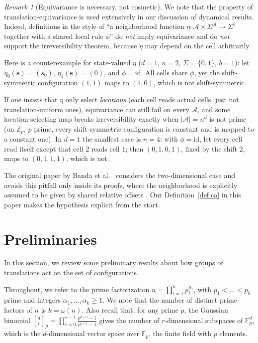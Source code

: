 \documentclass[11pt,a4paper]{article}
\theoremstyle{remark}
\newtheorem{remark}[theorem]{Remark}
\newcommand{\ZZ}{\mathbb{Z}}
\newcommand{\FF}{\mathbb{F}}
\newcommand{\A}{\mathcal{A}}
\newcommand{\ssb}{\mathbf{s}}
\newcommand{\gaussbinom}[2]{\genfrac{[}{]}{0pt}{}{#1}{#2}}
\begin{document}
\begin{remark}[Equivariance is necessary, not cosmetic]
\label{rem:equivariance-needed}
We note that the property of translation-equivariance is used extensively in our discussion of dynamical results. Indeed, definitions in the style of ``a neighborhood function
$\eta:\A\times\Sigma^{\A}\to\Sigma^b$ together with a shared local rule
$\phi$'' do \emph{not} imply equivariance and do \emph{not} support the
irreversibility theorem, because $\eta$ may depend on the cell
arbitrarily. 

Here is a counterexample for state-valued $\eta$ ($d=1$, $n=2$,
$\Sigma=\{0,1\}$, $b=1$): let $\eta_0(\ssb)=(s_0)$, $\eta_1(\ssb)=(0)$, and
$\phi=\mathrm{id}$. All cells share $\phi$, yet the shift-symmetric
configuration $(1,1)$ maps to $(1,0)$, which is not shift-symmetric. 

If one insists that $\eta$ only select \emph{locations} (each cell reads
actual cells, just not translation-uniform ones), equivariance can still
fail on every $\A$, and some location-selecting map breaks irreversibility
exactly when $|\A|=n^d$ is not prime (on $\ZZ_p$, $p$ prime, every
shift-symmetric configuration is constant and is mapped to a constant
one). In $d=1$ the smallest case is $n=4$: with $\phi=\mathrm{id}$, let every cell
read itself except that cell $2$ reads cell $1$; then $(0,1,0,1)$, fixed
by the shift $2$, maps to $(0,1,1,1)$, which is not. 

The original paper by Banda et al.~\cite{banda2019} considers the two-dimensional
case and avoids this pitfall only inside its proofs, where the neighborhood is explicitly
assumed to be given by shared relative offsets \cite[Lemma~A.5]{banda2019}. Our
Definition~\ref{def:ca} in this paper makes the hypothesis explicit from the start.
\end{remark}

\section{Preliminaries}\label{sec:prelim}



In this section, we review some preliminary results about how groups of translations act on the set of configurations.

Throughout, we refer to the prime factorization $n=\prod_{i=1}^{k}p_i^{\alpha_i}$, with $p_1<\dots<p_k$ prime and integers $\alpha_1,\dots,\alpha_k\ge1$. We note that the number of distinct prime factors of $n$ is $k=\omega(n)$. Also recall that, for any prime $p$, the Gaussian binomial $\gaussbinom dr_p=\prod_{i=0}^{r-1}
\frac{p^{d-i}-1}{p^{i+1}-1}$ gives the number of
$r$-dimensional subspaces of $\FF_p^d$, which is the $d$-dimensional vector space over $\FF_p$, the finite field with $p$ elements.
\end{document}
